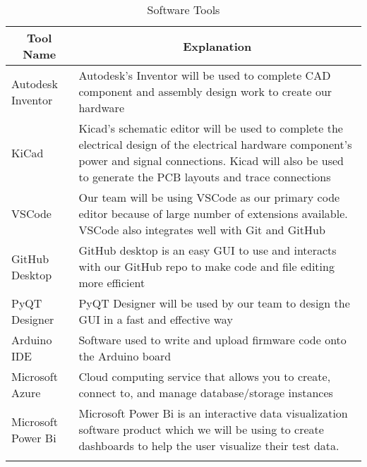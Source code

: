 \documentclass[12pt,titlepage]{article}
\begin{document}
	\begin{longtable}{|p{6cm}|p{10cm}|}
		\hline
		\multicolumn{1}{|c|}{\textbf{Tool Name}} & \multicolumn{1}{c|}{\textbf{Explanation}} 
		\\ \hline
		Autodesk Inventor
		&  Autodesk's Inventor will be used to complete CAD component and assembly design work to create our hardware  
		\newline                              
		\\ \hline
		KiCad
		& Kicad's schematic editor will be used to complete the electrical design of the electrical hardware component's power and signal connections. Kicad will also be used to generate the PCB layouts and trace connections
		\newline                              
		\\ \hline
		VSCode
		&  Our team will be using VSCode as our primary code editor because of large number of extensions available. VSCode also integrates well with Git and GitHub
		\newline                              
		\\ \hline
		GitHub Desktop
		&  GitHub desktop is an easy GUI to use and interacts with our GitHub repo to make code and file editing more efficient
		\newline                              
		\\ \hline
		PyQT Designer
		&  PyQT Designer will be used by our team to design the GUI in a fast and effective way
		\newline                     
		\\ \hline
		Arduino IDE
		&  Software used to write and upload firmware code onto the Arduino board
		\newline                     
		\\ \hline
		Microsoft Azure
		&  Cloud computing service that allows you to create, connect to, and manage database/storage instances
		\newline                     
		\\ \hline
		Microsoft Power Bi
		&  Microsoft Power Bi is an interactive data visualization software product which we will be using to create dashboards to help the user visualize their test data.
		\newline                              
		\\ \hline
		\caption{Software Tools}
	\end{longtable}
\end{document}

